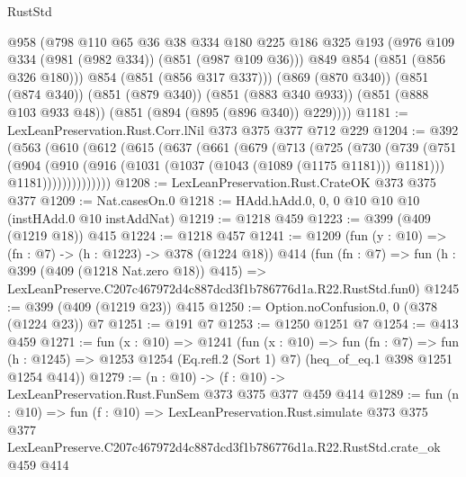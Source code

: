 \begin{lexlean}{RustStd}
\begin{coremodule}
          @958
          (@798
            @110
            @65
            @36
            @38
            @334
            @180
            @225
            @186
            @325
            @193
            (@976 @109 @334 (@981 (@982 @334)) (@851 (@987 @109 @36)))
            @849
            @854
            (@851 (@856 @326 @180)))
          @854
          (@851 (@856 @317 @337)))
        (@869 (@870 @340))
        (@851 (@874 @340))
        (@851 (@879 @340))
        (@851 (@883 @340 @933))
        (@851 (@888 @103 @933 @48))
        (@851 (@894 (@895 (@896 @340)) @229))))
@1181 := LexLeanPreservation.Rust.Corr.lNil @373 @375 @377 @712 @229
@1204 := @392
    (@563
      (@610
        (@612
          (@615
            (@637
              (@661
                (@679
                  (@713
                    (@725
                      (@730
                        (@739
                          (@751
                            (@904
                              (@910
                                (@916 (@1031 (@1037 (@1043 (@1089 (@1175 @1181))) @1181)))
                                @1181))))))))))))))
@1208 := LexLeanPreservation.Rust.CrateOK @373 @375 @377
@1209 := Nat.casesOn.{0}
@1218 := HAdd.hAdd.{0, 0, 0} @10 @10 @10 (instHAdd.{0} @10 instAddNat)
@1219 := @1218 @459
@1223 := @399 (@409 (@1219 @18)) @415
@1224 := @1218 @457
@1241 := @1209
    (fun (y : @10) => (fn : @7) -> (h : @1223) -> @378 (@1224 @18))
    @414
    (fun (fn : @7) =>
    fun (h : @399 (@409 (@1218 Nat.zero @18)) @415) =>
    LexLeanPreserve.C207c467972d4c887dcd3f1b786776d1a.R22.RustStd.fun0)
@1245 := @399 (@409 (@1219 @23)) @415
@1250 := Option.noConfusion.{0, 0} (@378 (@1224 @23)) @7
@1251 := @191 @7
@1253 := @1250 @1251 @7
@1254 := @413 @459
@1271 := fun (x : @10) =>
  @1241
    (fun (x : @10) =>
    fun (fn : @7) =>
    fun (h : @1245) => @1253 @1254 (Eq.refl.{2} (Sort 1) @7) (heq_of_eq.{1} @398 @1251 @1254 @414))
@1279 := (n : @10) -> (f : @10) -> LexLeanPreservation.Rust.FunSem @373 @375 @377 @459 @414
@1289 := fun (n : @10) =>
  fun (f : @10) =>
  LexLeanPreservation.Rust.simulate
    @373
    @375
    @377
    LexLeanPreserve.C207c467972d4c887dcd3f1b786776d1a.R22.RustStd.crate_ok
    @459
    @414
\end{coremodule}
\end{lexlean}
